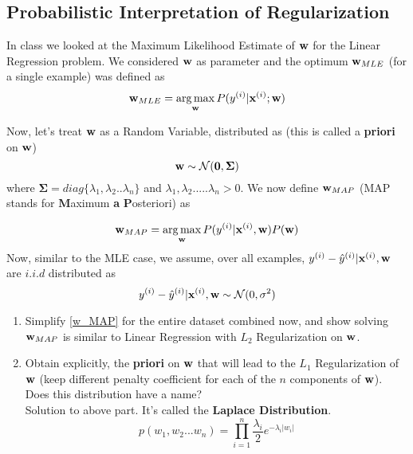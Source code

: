 \subsection{Probabilistic Interpretation of Regularization}

In class we looked at the Maximum Likelihood Estimate of $\mathbf{w}$ for the Linear Regression problem. We considered $\mathbf{w}$ as parameter and the optimum $\mathbf{w}_{MLE}$ (for a single example) was defined as
$$\mathbf{w}_{MLE} = \operatorname*{arg\,max}_{\mathbf{w}} P(y^{(i)} | \mathbf{x}^{(i)} ; \mathbf{w})$$

Now, let's treat $\mathbf{w}$ as a Random Variable, distributed as (this is called a \textbf{priori} on $\mathbf{w}$)
$$\mathbf{w} \sim  \mathcal {N}(\mathbf{0},\mathbf{\Sigma})$$
where $\mathbf{\Sigma} = diag\{\lambda_1, \lambda_2..\lambda_n\}$ and $\lambda_1, \lambda_2.....\lambda_n > 0$. We now define $\mathbf{w}_{MAP}$ (MAP stands for \textbf{M}aximum \textbf{a} \textbf{P}osteriori) as 

\begin{equation}\label{w_MAP}
\mathbf{w}_{MAP} = \operatorname*{arg\,max}_{\mathbf{w}} P(y^{(i)} | \mathbf{x}^{(i)}, \mathbf{w}) P(\mathbf{w})
\end{equation}
Now, similar to the MLE case, we assume, over all examples, $y^{(i)} - \hat{y}^{(i)}| \mathbf{x}^{(i)}, \mathbf{w}$ are $i.i.d$ distributed as
\begin{equation*}
y^{(i)} - \hat{y}^{(i)}| \mathbf{x}^{(i)}, \mathbf{w} \sim \mathcal{N}(0, \sigma^2)
\end{equation*}

\begin{enumerate}[label=\alph*)]
\item 
Simplify \autoref{w_MAP} for the entire dataset combined now, and show solving $\mathbf{w}_{MAP}$ is similar to Linear Regression with $L_2$ Regularization on $\mathbf{w}$.
\item 
Obtain explicitly, the \textbf{priori} on $\mathbf{w}$ that will lead to the $L_1$ Regularization of $\mathbf{w}$ (keep different penalty coefficient for each of the $n$ components of $\mathbf{w}$). Does this distribution have a name?\\

Solution to above part. It's called the \textbf{Laplace Distribution}.
    $$p(w_1, w_2...w_n) = \prod_{i=1}^{n}\frac{\lambda_i}{2}e^{-\lambda_i |w_i|}$$
\end{enumerate}